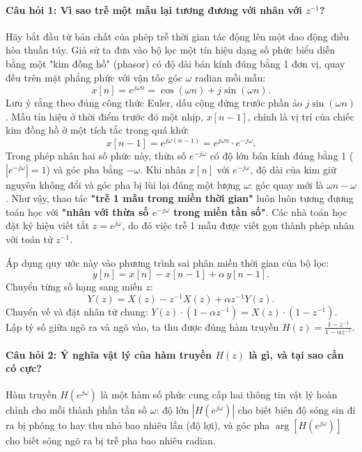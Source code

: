 \paragraph{Câu hỏi 1: Vì sao trễ một mẫu lại tương đương với nhân với $z^{-1}$?}
Hãy bắt đầu từ bản chất của phép trễ thời gian tác động lên một dao động điều hòa thuần túy. Giả sử ta đưa vào bộ lọc một tín hiệu dạng số phức biểu diễn bằng một "kim đồng hồ" (phasor) có độ dài bán kính đúng bằng 1 đơn vị, quay đều trên mặt phẳng phức với vận tốc góc $\omega$ radian mỗi mẫu:
\begin{equation}
x[n] = e^{j\omega n} = \cos(\omega n) + j\sin(\omega n).
\end{equation}
Lưu ý rằng theo đúng công thức Euler, dấu cộng đứng trước phần ảo $j\sin(\omega n)$. Mẫu tín hiệu ở thời điểm trước đó một nhịp, $x[n-1]$, chính là vị trí của chiếc kim đồng hồ ở một tích tắc trong quá khứ:
\begin{equation}
x[n-1] = e^{j\omega(n-1)} = e^{j\omega n}\cdot e^{-j\omega}.
\end{equation}
Trong phép nhân hai số phức này, thừa số $e^{-j\omega}$ có độ lớn bán kính đúng bằng 1 ($|e^{-j\omega}| = 1$) và góc pha bằng $-\omega$. Khi nhân $x[n]$ với $e^{-j\omega}$, độ dài của kim giữ nguyên không đổi và góc pha bị lùi lại đúng một lượng $\omega$: góc quay mới là $\omega n - \omega$. Như vậy, thao tác \textbf{"trễ 1 mẫu trong miền thời gian"} luôn luôn tương đương toán học với \textbf{"nhân với thừa số $e^{-j\omega}$ trong miền tần số"}. Các nhà toán học đặt ký hiệu viết tắt $z = e^{j\omega}$, do đó việc trễ 1 mẫu được viết gọn thành phép nhân với toán tử $z^{-1}$.

Áp dụng quy ước này vào phương trình sai phân miền thời gian của bộ lọc:
\begin{equation}
y[n] = x[n] - x[n-1] + \alpha\, y[n-1].
\end{equation}
Chuyển từng số hạng sang miền $z$:
\begin{equation}
Y(z) = X(z) - z^{-1}X(z) + \alpha z^{-1}Y(z).
\end{equation}
Chuyển vế và đặt nhân tử chung: $Y(z)\cdot (1 - \alpha z^{-1}) = X(z)\cdot (1 - z^{-1})$. Lập tỷ số giữa ngõ ra và ngõ vào, ta thu được đúng hàm truyền $H(z) = \frac{1 - z^{-1}}{1 - \alpha z^{-1}}$.

\paragraph{Câu hỏi 2: Ý nghĩa vật lý của hàm truyền $H(z)$ là gì, và tại sao cần có cực?}
Hàm truyền $H(e^{j\omega})$ là một hàm số phức cung cấp hai thông tin vật lý hoàn chỉnh cho mỗi thành phần tần số $\omega$: độ lớn $|H(e^{j\omega})|$ cho biết biên độ sóng sin đi ra bị phóng to hay thu nhỏ bao nhiêu lần (độ lợi), và góc pha $\arg[H(e^{j\omega})]$ cho biết sóng ngõ ra bị trễ pha bao nhiêu radian.

